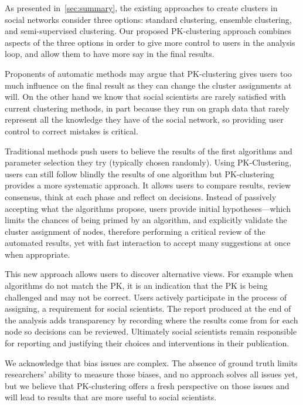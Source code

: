 \begin{revs}
As presented in~\autoref{sec:summary}, the existing approaches to create clusters in social networks consider three options: standard clustering, ensemble clustering, and semi-supervised clustering. Our proposed PK-clustering approach combines aspects of the three options in order to give more control to users in the analysis loop, and allow them to have more say in the final results.

Proponents of automatic methods may argue that PK-clustering gives users too much influence on the final result as they can change the cluster assignments at will. On the other hand we know that social scientists are rarely satisfied with current clustering methods, in part because they run on graph data that rarely represent all the knowledge they have of the social network, so providing user control to correct mistakes is critical.

Traditional methods push users to believe the results of the first algorithms and parameter selection they try (typically chosen randomly). Using PK-Clustering, users can still follow blindly the results of one algorithm but PK-clustering provides a more systematic approach. It allows users to compare results, review consensus, think at each phase and reflect on decisions. Instead of passively accepting what the algorithms propose, users provide initial hypotheses---which limits the chances of being primed by an algorithm, and explicitly validate the cluster assignment of nodes, therefore performing a critical review of the automated results, yet with fast interaction to accept many suggestions at once when appropriate.

This new approach allows users to discover alternative views. For example when algorithms do not match the PK, it is an indication that the PK is being challenged and may not be correct.  Users actively participate in the process of assigning, a requirement for social scientists. The report produced at the end of the analysis adds transparency by recording where the results come from for each node so decisions can be reviewed. Ultimately social scientists remain responsible for reporting and justifying their choices and interventions in their publication.

We acknowledge that bias issues are complex. The absence of ground truth limits researchers' ability to measure those biases, and no approach solves all issues yet, but we believe that PK-clustering offers a fresh perspective on those issues and will lead to results that are more useful to social scientists.
\end{revs}


